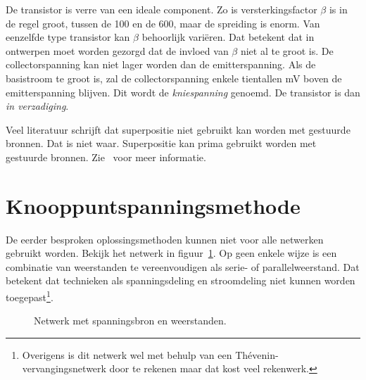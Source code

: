 \begin{example}
De transistor is verre van een ideale component. Zo is versterkingsfactor $\beta$ is in de regel groot, tussen de 100 en de 600, maar de spreiding is enorm. Van eenzelfde type transistor kan $\beta$ behoorlijk variëren. Dat betekent dat in ontwerpen moet worden gezorgd dat de invloed van $\beta$ niet al te groot is. De collectorspanning kan niet lager worden dan de emitterspanning. Als de basistroom te groot is, zal de collectorspanning enkele tientallen \si{\milli\volt} boven de emitterspanning blijven. Dit wordt de \textsl{kniespanning} genoemd. De transistor is dan \textsl{in verzadiging}.
\end{example}


Veel literatuur schrijft dat superpositie niet gebruikt kan worden met gestuurde bronnen. Dat is niet waar. Superpositie kan prima gebruikt worden met gestuurde bronnen. Zie~\cite{leachapplication} voor meer informatie.


\fi

\ifknooppunt


\section{Knooppuntspanningsmethode}
De eerder besproken oplossingsmethoden kunnen niet voor alle netwerken gebruikt worden. Bekijk het netwerk in figuur~\ref{fig:gelnetwerkvoornodalanalysis}. Op geen enkele wijze is een combinatie van weerstanden te vereenvoudigen als serie- of parallelweerstand. Dat betekent dat technieken als spanningsdeling en stroomdeling niet kunnen worden toegepast\footnote{Overigens is dit netwerk wel met behulp van een Thévenin-vervangingsnetwerk door te rekenen maar dat kost veel rekenwerk.}.

\begin{figure}[!ht]
\centering
{}
\caption{Netwerk met spanningsbron en weerstanden.}
\label{fig:gelnetwerkvoornodalanalysis}
\end{figure}

